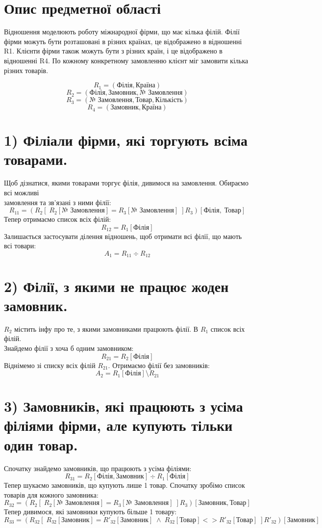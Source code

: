 \documentclass[11pt, a4paper]{article} %
\begin{document}
\section*{Опис предметної області}
Відношення моделюють роботу міжнародної фірми, що має кілька філій. Філії фірми можуть бути розташовані в різних країнах, це відображено в відношенні R1. Клієнти фірми також можуть бути з різних країн, і це відображено в відношенні R4. По кожному конкретному замовленню клієнт міг замовити кілька різних товарів. 

\begin{mdframed}
    $$R_1 = (\text{Філія}, \text{Країна})$$
    $$R_2 = (\text{Філія}, \text{Замовник}, \text{№ Замовлення})$$
    $$R_3 = (\text{№ Замовлення}, \text{Товар}, \text{Кількість})$$
    $$R_4 = (\text{Замовник}, \text{Країна})$$
\end{mdframed}

\section*{1) Філіали фірми, які торгують всіма товарами.}

Щоб дізнатися, якими товарами торгує філія, дивимося на замовлення.
Обираємо всі можливі \\ замовлення та зв'язані з ними філії:
$$R_{11} = \left(R_2[\;R_2[\text{№ Замовлення}] = R_3[\text{№ Замовлення}]\;]R_3\right)[\text{Філія},\;\text{Товар}]$$
Тепер отримаємо список всіх філій:
$$R_{12} = R_1[\text{Філія}]$$
Залишається застосувати ділення відношень, щоб отримати всі філії, що мають всі товари:
$$A_1 = R_{11} \div R_{12}$$

\section*{2) Філії, з якими не працює жоден замовник. }

$R_2$ містить інфу про те, з якими замовниками працюють філії.
В $R_1$ список всіх філій. \\
Знайдемо філії з хоча б одним замовником:
$$R_{21} = R_2[\text{Філія}]$$
Віднімемо зі списку всіх філій $R_{21}$. Отримаємо філії без замовників:
$$A_2 = R_1[\text{Філія}] \setminus R_{21}$$

\section*{3) Замовників, які працюють з усіма філіями фірми, але купують тільки один товар.}
Спочатку знайдемо замовників, що працюють з усіма філіями:
$$R_{31} = R_2[\text{Філія}, \text{Замовник}] \div R_1[\text{Філія}] $$
Тепер шукаємо замовників, що купують лише 1 товар. 
Спочатку зробімо список товарів для кожного замовника:
$$R_{32} = (R_2[\;R_2[\text{№ Замовлення}] = R_3[\text{№ Замовлення}]\;]R_3)[\text{Замовник},\text{Товар}]$$
Тепер дивимося, які замовники купують більше 1 товару:
$$R_{33} = (R_{32}[\;R_{32}[\text{Замовник}]=R'_{32}[\text{Замовник}]\;\wedge\;
R_{32}[\text{Товар}]<>R'_{32}[\text{Товар}]\;]R'_{32})[\text{Замовник}]$$
\end{document}
